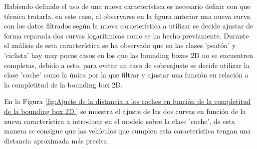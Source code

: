 Habiendo definido el uso de una nueva característica es necesario definir con que técnica tratarla, en este caso, al observarse en la figura anterior una nueva curva con los datos filtrados según la nueva característica a utilizar se decide ajustar de forma separada dos curvas logarítmicas como se ha hecho previamente. Durante el análisis de esta característica se ha observado que en las clases 'peatón' y 'ciclista' hay muy pocos casos en los que las bounding boxes 2D no se encuentren completas, debido a esto, para evitar un caso de sobreajuste se decide utilizar la clase 'coche' como la única por la que filtrar y ajustar una función en relación a la completitud de la bounding box 2D.

En la Figura \ref{fig:Ajuste de la distancia a los coches en función de la completitud de la bounding box 2D.} se muestra el ajuste de las dos curvas en función de la nueva característica a introducir en el modelo sobre la clase 'coche', de esta manera se consigue que las vehículos que cumplen esta característica tengan una distancia aproximada más precisa.


